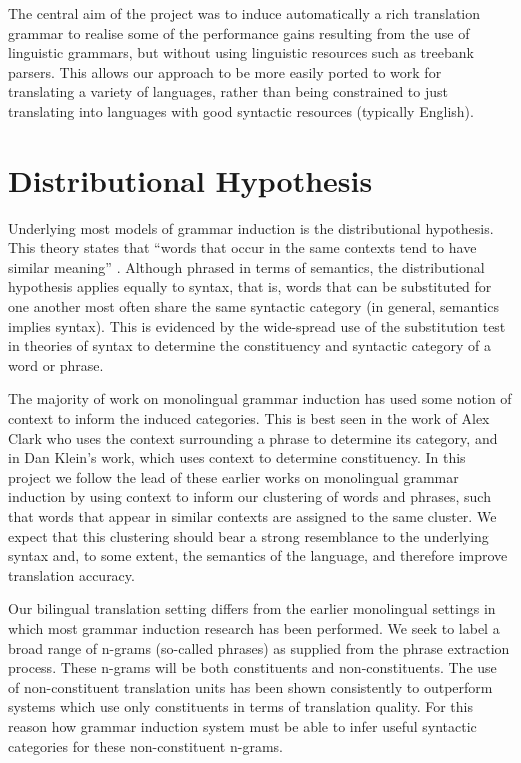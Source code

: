 The central aim of the project was to induce automatically a rich translation grammar to realise some of the performance gains resulting from the use of linguistic grammars, but without using linguistic resources such as treebank parsers.
This allows our approach to be more easily ported to work for translating a variety of languages, rather than being constrained to just translating into languages with good syntactic resources (typically English).

\section{Distributional Hypothesis}

Underlying most models of grammar induction is the distributional hypothesis. This theory states that
``words that occur in the same contexts tend to have similar meaning'' \cite{harris:54}. Although phrased in terms of semantics, the distributional hypothesis applies equally to syntax, that is, words that can be substituted for one another most often share the same syntactic category (in general, semantics implies syntax). This is evidenced by the wide-spread use of the substitution test in theories of syntax to determine the constituency and syntactic category of a word or phrase.

The majority of work on monolingual grammar induction has used some notion of context to inform the induced categories. This is best seen in the work of Alex Clark who uses the context surrounding a phrase to determine its category, and in Dan Klein's work, which uses context to determine constituency. In this project we follow the lead of these earlier works on monolingual grammar induction by using context to inform our clustering of words and phrases, such that words that appear in similar contexts are assigned to the same cluster. We expect that this clustering should bear a strong resemblance to the underlying syntax and, to some extent, the semantics of the language, and therefore improve translation accuracy.

Our bilingual translation setting differs from the earlier monolingual settings in which most grammar induction research has been performed. We seek to label a broad range of n-grams (so-called phrases) as supplied from the phrase extraction process. These n-grams will be both constituents and non-constituents. The use of non-constituent translation units has been shown consistently to outperform systems which use only constituents in terms of translation quality. For this reason how grammar induction system must be able to infer useful syntactic categories for these non-constituent n-grams.

